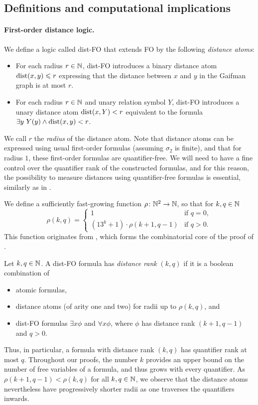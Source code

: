     

\subsection{Definitions and computational implications}\label{sec:typedefs}


\paragraph{First-order distance logic.}
We define a logic called dist-FO that extends FO by the following \emph{distance atoms}:
\begin{itemize}
    \item For each radius \(r \in \mathbb N\), dist-FO introduces 
        a binary distance atom \(\mathrm{dist}(x,y) \leqslant r\) expressing that the distance between \(x\) and \(y\) in the Gaifman graph is at most \(r\).
    \item For each radius \(r \in \mathbb N\) and unary relation symbol \(Y\), dist-FO introduces
        a unary distance atom \(\mathrm{dist}(x,Y) < r\) equivalent to the formula
        \(\exists y~Y(y) \land \mathrm{dist}(x,y) < r\).
\end{itemize}
We call \(r\) the \emph{radius} of the distance atom.
Note that distance atoms can be expressed 
using usual first-order formulas (assuming $\sigma_2$ is finite),
and that for radius \(1\), these first-order formulas are quantifier-free.
We will need to have a fine control over the quantifier rank of the constructed formulas, and for this reason, the possibility to measure distances using quantifier-free formulas is essential, similarly as in \cite{gks}.


We define a sufficiently fast-growing function $\rho\colon \mathbb N^2\to\mathbb N$, so that for $k,q\in\mathbb N$
    \[
        \rho(k,q) = 
        \begin{cases}
            1 & \text{if }q=0, \\
            (13^{k}+1) \cdot \rho(k+1,q-1) & \text{if }q > 0.
        \end{cases}
    \]
This function originates from , which forms the combinatorial core of the proof of .


Let \(k,q \in \mathbb N\).
A dist-FO formula has \emph{distance rank} \((k,q)\) if it is a boolean combination of
\begin{itemize}
    \item atomic formulas, 
    \item distance atoms (of arity one and two) for radii up to \(\rho(k,q)\), and
    \item dist-FO formulas \(\exists x \phi\) and \(\forall x \phi\), where \(\phi\) has distance rank \((k+1,q-1)\) and \(q > 0\).
\end{itemize}
Thus, in particular, a formula with distance rank \((k,q)\) has quantifier rank at most \(q\).
Throughout our proofs, the number \(k\) provides an upper bound on the number of free variables of a formula, and
thus grows with every quantifier.
As \(\rho(k+1,q-1) < \rho(k,q)\) for all \(k,q \in \mathbb N\),
we observe that the distance atoms nevertheless have progressively shorter radii as one traverses the quantifiers inwards.


